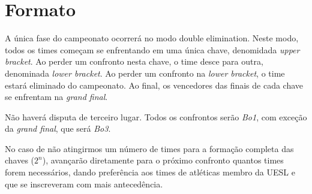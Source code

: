 \section{Formato}

A única fase do campeonato ocorrerá no modo double elimination. Neste modo, todos os times começam se enfrentando em uma única chave, denomidada \textit{upper bracket}. Ao perder um confronto nesta chave, o time desce para outra, denominada \textit{lower bracket}. Ao perder um confronto na \textit{lower bracket}, o time estará eliminado do campeonato. Ao final, os vencedores das finais de cada chave se enfrentam na \textit{grand final}.

Não haverá disputa de terceiro lugar. Todos os confrontos serão \textit{Bo1}, com exceção da \textit{grand final}, que será \textit{Bo3}.

No caso de não atingirmos um número de times para a formação completa das chaves (\(2^n\)), avançarão diretamente para o próximo confronto quantos times forem necessários, dando preferência aos times de atléticas membro da UESL e que se inscreveram com mais antecedência.



